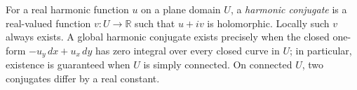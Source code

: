 
For a real harmonic function $u$ on a plane domain $U$, a \emph{harmonic conjugate} is a real-valued function $v:U\to\mathbb R$ such that $u+iv$ is holomorphic. Locally such $v$ always exists. A global harmonic conjugate exists precisely when the closed one-form $-u_y\,dx+u_x\,dy$ has zero integral over every closed curve in $U$; in particular, existence is guaranteed when $U$ is simply connected. On connected $U$, two conjugates differ by a real constant.
